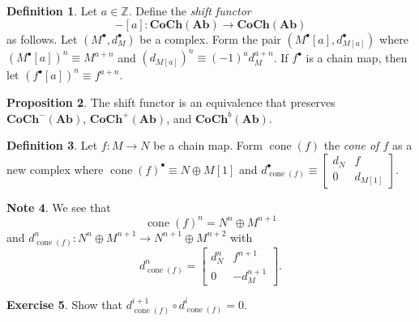 \documentclass[10pt,letterpaper,cm]{nupset}
\theoremstyle{definition}
\newtheorem{definition}{Definition}[subsection]
\newtheorem{note}[definition]{Note}
\theoremstyle{theorem}
\newtheorem{prop}[definition]{Proposition}
\newtheorem{exercise}[definition]{Exercise}
\theoremstyle{remark}
\newcommand{\Z}{\mathbb Z}
\newcommand{\1}{\mathbf{1}}
\newcommand{\0}{\vec 0}
\DeclareMathOperator{\cone}{cone}
\begin{document}
\begin{definition}
Let $a\in \Z$. Define the \textit{shift functor} $${-}[a] : \mathbf{CoCh}(\mathbf{Ab}) \to \mathbf{CoCh}(\mathbf{Ab})$$ as follows. Let $(M^{\bullet}, d^{\bullet}_{M})$ be a complex.  Form the pair $(M^{\bullet}[a], d^{\bullet}_{M[a]})$ where $(M^{\bullet}[a])^n \equiv M^{a+n}$ and $(d_{M[a]})^n \equiv ({-}1)^a d^{a+n}_M$. If $f^{\bullet}$ is a chain map, then let $(f^{\bullet}[a])^n \equiv f^{a+n}$.
\end{definition}

\begin{prop}
The shift functor  is an equivalence that preserves $\mathbf{CoCh}^{{-}}(\mathbf{Ab})$, $\mathbf{CoCh}^{+}(\mathbf{Ab})$, and $\mathbf{CoCh}^{b}(\mathbf{Ab})$.
\end{prop}

\begin{definition}
Let $f: M \to N$ be a chain map. Form  $\cone(f)$ the \textit{cone of $f$} as a new complex where $\cone(f)^{\bullet} \equiv N \oplus M[1]$ and $d_{\cone(f)}^{\bullet} \equiv \begin{bmatrix}  d_N & f \\ 0 & d_{M[1]}    \end{bmatrix}.$
\end{definition}

\begin{note}
We see that $$\cone(f)^n = N^n \oplus M^{n+1}$$ and $d^n_{\cone(f)} : N^n \oplus M^{n+1} \to N^{n+1} \oplus M^{n+2}$ with $$d^n_{\cone(f)}  = \begin{bmatrix}  d_N^n & f^{n+1} \\ 0 & {-}d_M^{n+1}  \end{bmatrix}.$$
\end{note}

\begin{exercise}
Show that $d^{i+1}_{\cone(f)} \circ d^i_{\cone(f)} =0$.
\end{exercise}
\end{document}
